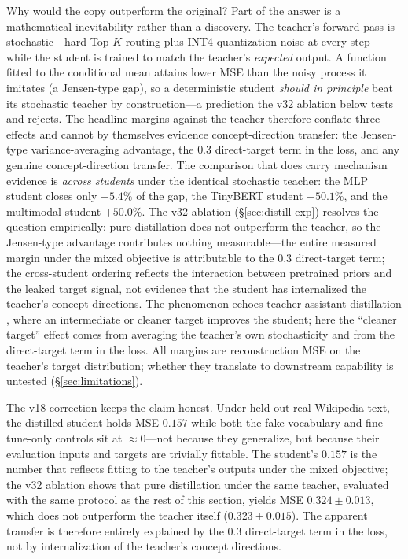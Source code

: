 \documentclass[10pt,twoside]{article}
\theoremstyle{definition}
\begin{document}
Why would the copy outperform the original? Part of the answer is a mathematical inevitability rather than a discovery. The teacher's forward pass is stochastic---hard Top-$K$ routing plus INT4 quantization noise at every step---while the student is trained to match the teacher's \emph{expected} output. A function fitted to the conditional mean attains lower MSE than the noisy process it imitates (a Jensen-type gap), so a deterministic student \emph{should in principle} beat its stochastic teacher by construction---a prediction the v32 ablation below tests and rejects. The headline margins against the teacher therefore conflate three effects and cannot by themselves evidence concept-direction transfer: the Jensen-type variance-averaging advantage, the $0.3$ direct-target term in the loss, and any genuine concept-direction transfer. The comparison that does carry mechanism evidence is \emph{across students} under the identical stochastic teacher: the MLP student closes only $+5.4\%$ of the gap, the TinyBERT student $+50.1\%$, and the multimodal student $+50.0\%$. The v32 ablation (\S\ref{sec:distill-exp}) resolves the question empirically: pure distillation does not outperform the teacher, so the Jensen-type advantage contributes nothing measurable---the entire measured margin under the mixed objective is attributable to the $0.3$ direct-target term; the cross-student ordering reflects the interaction between pretrained priors and the leaked target signal, not evidence that the student has internalized the teacher's concept directions. The phenomenon echoes teacher-assistant distillation \citep{mirzadeh2020}, where an intermediate or cleaner target improves the student; here the ``cleaner target'' effect comes from averaging the teacher's own stochasticity and from the direct-target term in the loss. All margins are reconstruction MSE on the teacher's target distribution; whether they translate to downstream capability is untested (\S\ref{sec:limitations}).

The v18 correction keeps the claim honest. Under held-out real Wikipedia text, the distilled student holds MSE $0.157$ while both the fake-vocabulary and fine-tune-only controls sit at $\approx 0$---not because they generalize, but because their evaluation inputs and targets are trivially fittable. The student's $0.157$ is the number that reflects fitting to the teacher's outputs under the mixed objective; the v32 ablation shows that pure distillation under the same teacher, evaluated with the same protocol as the rest of this section, yields MSE $0.324 \pm 0.013$, which does not outperform the teacher itself ($0.323 \pm 0.015$). The apparent transfer is therefore entirely explained by the $0.3$ direct-target term in the loss, not by internalization of the teacher's concept directions.
\end{document}
